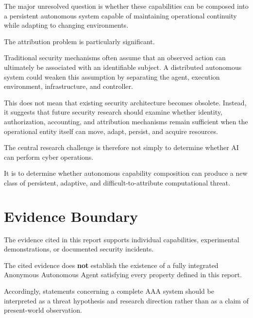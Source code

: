 \documentclass[11pt,a4paper]{article}
\begin{document}
The major unresolved question is whether these capabilities can be composed
into a persistent autonomous system capable of maintaining operational
continuity while adapting to changing environments.

The attribution problem is particularly significant.

Traditional security mechanisms often assume that an observed action can
ultimately be associated with an identifiable subject. A distributed
autonomous system could weaken this assumption by separating the agent,
execution environment, infrastructure, and controller.

This does not mean that existing security architecture becomes obsolete.
Instead, it suggests that future security research should examine whether
identity, authorization, accounting, and attribution mechanisms remain
sufficient when the operational entity itself can move, adapt, persist, and
acquire resources.

The central research challenge is therefore not simply to determine whether
AI can perform cyber operations.

It is to determine whether autonomous capability composition can produce a
new class of persistent, adaptive, and difficult-to-attribute computational
threat.

\section*{Evidence Boundary}

The evidence cited in this report supports individual capabilities,
experimental demonstrations, or documented security incidents.

The cited evidence does \textbf{not} establish the existence of a fully
integrated Anonymous Autonomous Agent satisfying every property defined in
this report.

Accordingly, statements concerning a complete AAA system should be
interpreted as a threat hypothesis and research direction rather than as a
claim of present-world observation.
\end{document}
